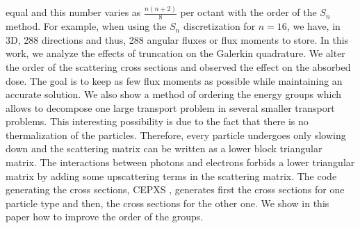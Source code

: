 equal and this number varies as $\frac{n(n+2)}{8}$ per octant with the order of the $S_n$ method.  
For example, when using the $S_n$ discretization for $n=16$, we have, in 3D, 
288 directions and thus, 288 angular fluxes or flux moments to store. In this 
work, we analyze the effects of truncation on the Galerkin quadrature. We
alter the order of the scattering cross sections and observed the effect on the 
absorbed dose. The goal is to keep as few flux moments as possible while 
maintaining an accurate solution. We also show a method of ordering
the energy groups which allows to decompose one large transport problem in
several smaller transport problems. This interesting possibility is due to
the fact that there is no thermalization of the particles. Therefore, every
particle undergoes only slowing down and the scattering matrix can be written
as a lower block triangular matrix. The interactions between photons and
electrons forbids a lower triangular matrix by adding some
upscattering terms in the scattering matrix. The code generating the cross
sections, CEPXS \cite{cepxs}, generates first the cross sections for one
particle type and then, the cross sections for the other one. We show in this
paper how to improve the order of the groups.
